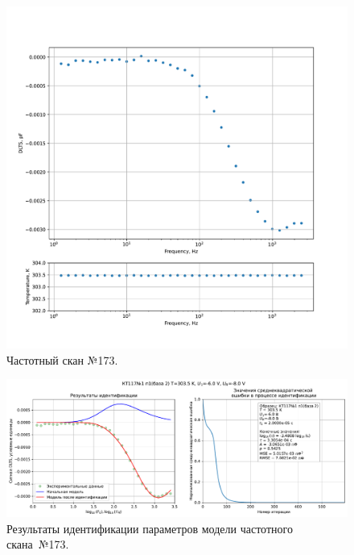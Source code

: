 \begin{figure}[!ht]
    \centering
    \includegraphics[width=1\textwidth]{../plots/КТ117№1_п1(база 2)_2500Гц-1Гц_1пФ_+30С_-6В-8В_50мВ_20мкс_шаг_0,1.pdf}
    \caption{Частотный скан №173.}
    \label{pic:frequency_scan_173}
\end{figure}

\begin{figure}[!ht]
    \centering
    \includegraphics[width=1\textwidth]{../plots/КТ117№1_п1(база 2)_2500Гц-1Гц_1пФ_+30С_-6В-8В_50мВ_20мкс_шаг_0,1_model.pdf}
    \caption{Результаты идентификации параметров модели частотного скана~№173.}
    \label{pic:frequency_scan_model173}
\end{figure}

\pagebreak


